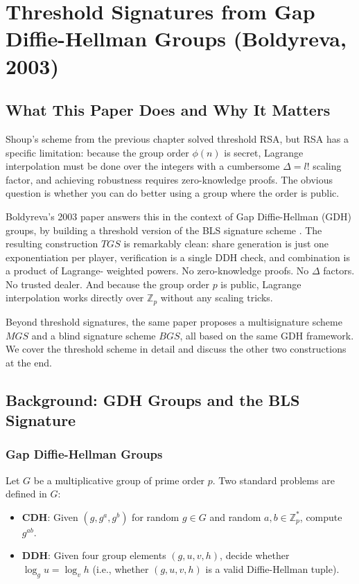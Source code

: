 \section{Threshold Signatures from Gap Diffie-Hellman Groups (Boldyreva, 2003)}
\label{sec:paper2}

\subsection{What This Paper Does and Why It Matters}

Shoup's scheme from the previous chapter solved threshold RSA, but RSA has a specific
limitation: because the group order $\phi(n)$ is secret, Lagrange interpolation must be
done over the integers with a cumbersome $\Delta = l!$ scaling factor, and achieving
robustness requires zero-knowledge proofs. The obvious question is whether you can do
better using a group where the order is public.

Boldyreva's 2003 paper answers this in the context of Gap Diffie-Hellman (GDH) groups,
by building a threshold version of the BLS signature scheme \cite{BLS}. The resulting
construction $TGS$ is remarkably clean: share generation is just one exponentiation per
player, verification is a single DDH check, and combination is a product of Lagrange-
weighted powers. No zero-knowledge proofs. No $\Delta$ factors. No trusted dealer. And
because the group order $p$ is public, Lagrange interpolation works directly over
$\mathbb{Z}_p$ without any scaling tricks.

Beyond threshold signatures, the same paper proposes a multisignature scheme $MGS$ and
a blind signature scheme $BGS$, all based on the same GDH framework. We cover the
threshold scheme in detail and discuss the other two constructions at the end.

\subsection{Background: GDH Groups and the BLS Signature}

\subsubsection{Gap Diffie-Hellman Groups}

Let $G$ be a multiplicative group of prime order $p$. Two standard problems are defined
in $G$:

\begin{itemize}
    \item \textbf{CDH}: Given $(g, g^a, g^b)$ for random $g \in G$ and random $a, b \in
    \mathbb{Z}_p^*$, compute $g^{ab}$.
    \item \textbf{DDH}: Given four group elements $(g, u, v, h)$, decide whether
    $\log_g u = \log_v h$ (i.e., whether $(g, u, v, h)$ is a valid Diffie-Hellman tuple).
\end{itemize}

